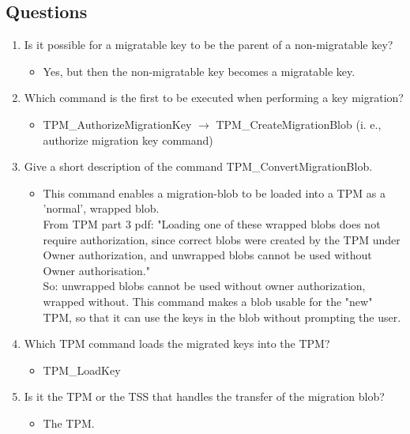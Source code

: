 \documentclass[10pt]{article}
\begin{document}
\subsection{Questions}
\begin{enumerate}
    \item {Is it possible for a migratable key to be the parent of a non-migratable key?} 
	\begin{itemize}
	    \item {Yes, but then the non-migratable key becomes a migratable key.}
	\end{itemize}
 
    \item {Which command is the first to be executed when performing a key migration?} 
	\begin{itemize}
	    \item {TPM\_AuthorizeMigrationKey  $\rightarrow$  TPM\_CreateMigrationBlob  (i. e., authorize migration key command)}
	\end{itemize}

    \item {Give a short description of the command TPM\_ConvertMigrationBlob.}
	\begin{itemize}
	    \item {This command enables a migration-blob to be loaded into a TPM as a 'normal', wrapped blob.\\
From TPM part 3 pdf: "Loading one of these wrapped blobs does not require authorization, since correct blobs were created by the TPM under Owner authorization, and unwrapped blobs cannot be used without Owner authorisation." \\
So: unwrapped blobs cannot be used without owner authorization, wrapped without. This command makes a blob usable for the "new" TPM, so that it can use the keys in the blob without prompting the user.}
	\end{itemize}

    \item {Which TPM command loads the migrated keys into the TPM?}
	\begin{itemize}
	    \item {TPM\_LoadKey}
	\end{itemize}

    \item {Is it the TPM or the TSS that handles the transfer of the migration blob? }
	\begin{itemize}
	    \item {The TPM.}
	\end{itemize}
\end{enumerate}
\end{document}

